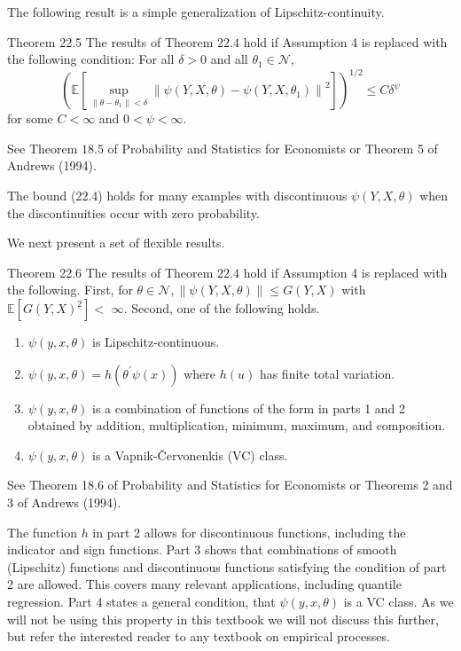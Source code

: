 \documentclass[10pt]{article}
\begin{document}
The following result is a simple generalization of Lipschitz-continuity.

Theorem 22.5 The results of Theorem $22.4$ hold if Assumption 4 is replaced with the following condition: For all $\delta>0$ and all $\theta_{1} \in \mathcal{N}$,
$$
\left(\mathbb{E}\left[\sup _{\left\|\theta-\theta_{1}\right\|<\delta}\left\|\psi(Y, X, \theta)-\psi\left(Y, X, \theta_{1}\right)\right\|^{2}\right]\right)^{1 / 2} \leq C \delta^{\psi}
$$
for some $C<\infty$ and $0<\psi<\infty$.

See Theorem $18.5$ of Probability and Statistics for Economists or Theorem 5 of Andrews (1994).

The bound (22.4) holds for many examples with discontinuous $\psi(Y, X, \theta)$ when the discontinuities occur with zero probability.

We next present a set of flexible results.

Theorem 22.6 The results of Theorem $22.4$ hold if Assumption 4 is replaced with the following. First, for $\theta \in \mathcal{N},\|\psi(Y, X, \theta)\| \leq G(Y, X)$ with $\mathbb{E}\left[G(Y, X)^{2}\right]<$ $\infty$. Second, one of the following holds.

\begin{enumerate}
  \item $\psi(y, x, \theta)$ is Lipschitz-continuous.

  \item $\psi(y, x, \theta)=h\left(\theta^{\prime} \psi(x)\right)$ where $h(u)$ has finite total variation.

  \item $\psi(y, x, \theta)$ is a combination of functions of the form in parts 1 and 2 obtained by addition, multiplication, minimum, maximum, and composition.

  \item $\psi(y, x, \theta)$ is a Vapnik-Červonenkis (VC) class.

\end{enumerate}
See Theorem 18.6 of Probability and Statistics for Economists or Theorems 2 and 3 of Andrews (1994).

The function $h$ in part 2 allows for discontinuous functions, including the indicator and sign functions. Part 3 shows that combinations of smooth (Lipschitz) functions and discontinuous functions satisfying the condition of part 2 are allowed. This covers many relevant applications, including quantile regression. Part 4 states a general condition, that $\psi(y, x, \theta)$ is a VC class. As we will not be using this property in this textbook we will not discuss this further, but refer the interested reader to any textbook on empirical processes.
\end{document}
